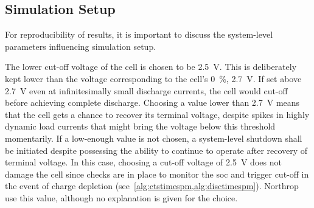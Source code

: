 \subsection{Simulation Setup}\label{subsec:basicspmsimsetup}

For  reproducibility of  results, it  is important  to discuss  the system-level
parameters influencing simulation setup.

The lower  cut-off voltage  of the  cell is chosen  to be  \SI{2.5}{\volt}. This
is  deliberately  kept  lower  than  the voltage  corresponding  to  the  cell's
\SI{0}{\percent},  \ie{}  \SI{2.7}{\volt}.  If set  above  \SI{2.7}{\volt}  even
at  infinitesimally small  discharge  currents, the  cell  would cut-off  before
achieving complete discharge. Choosing a value lower than \SI{2.7}{V} means that
the cell gets a chance to recover its terminal voltage, despite spikes in highly
dynamic  load  currents  that  might  bring the  voltage  below  this  threshold
momentarily. If a low-enough value is  not chosen, a system-level shutdown shall
be  initiated  despite possessing  the  ability  to  continue to  operate  after
recovery  of terminal  voltage.  In this  case, choosing  a  cut-off voltage  of
\SI{2.5}{\volt}  does  not  damage  the  cell  since  checks  are  in  place  to
monitor  the \gls{soc}  and trigger  cut-off in  the event  of charge  depletion
(see~\cref{alg:ctstimespm,alg:disctimespm}).  Northrop~\etal~\cite{Northrop2011}
use this value, although no explanation is given for the choice.

